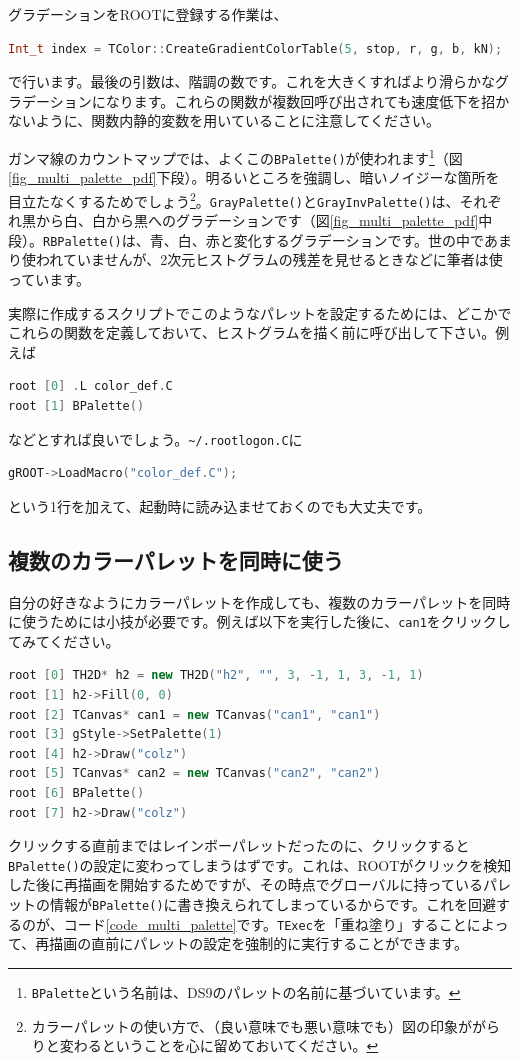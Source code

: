 グラデーションをROOTに登録する作業は、
\begin{lstlisting}[language=c++]
  Int_t index = TColor::CreateGradientColorTable(5, stop, r, g, b, kN);
\end{lstlisting}
で行います。最後の引数は、階調の数です。これを大きくすればより滑らかなグラデーションになります。これらの関数が複数回呼び出されても速度低下を招かないように、関数内静的変数を用いていることに注意してください。

ガンマ線のカウントマップでは、よくこの\texttt{BPalette()}が使われます\footnote{\texttt{BPalette}という名前は、DS9のパレットの名前に基づいています。}（図\ref{fig_multi_palette_pdf}下段）。明るいところを強調し、暗いノイジーな箇所を目立たなくするためでしょう\footnote{カラーパレットの使い方で、（良い意味でも悪い意味でも）図の印象ががらりと変わるということを心に留めておいてください。}。\texttt{GrayPalette()}と\texttt{GrayInvPalette()}は、それぞれ黒から白、白から黒へのグラデーションです（図\ref{fig_multi_palette_pdf}中段）。\texttt{RBPalette()}は、青、白、赤と変化するグラデーションです。世の中であまり使われていませんが、2次元ヒストグラムの残差を見せるときなどに筆者は使っています。

実際に作成するスクリプトでこのようなパレットを設定するためには、どこかでこれらの関数を定義しておいて、ヒストグラムを描く前に呼び出して下さい。例えば
\begin{lstlisting}[language=C++]
root [0] .L color_def.C
root [1] BPalette()
\end{lstlisting}
などとすれば良いでしょう。\texttt{\~{}/.rootlogon.C}に
\begin{lstlisting}[language=C++]
gROOT->LoadMacro("color_def.C");
\end{lstlisting}
という1行を加えて、起動時に読み込ませておくのでも大丈夫です。

\subsection{複数のカラーパレットを同時に使う}

自分の好きなようにカラーパレットを作成しても、複数のカラーパレットを同時に使うためには小技が必要です。例えば以下を実行した後に、\texttt{can1}をクリックしてみてください。
\begin{lstlisting}[language=C++]
root [0] TH2D* h2 = new TH2D("h2", "", 3, -1, 1, 3, -1, 1)
root [1] h2->Fill(0, 0)
root [2] TCanvas* can1 = new TCanvas("can1", "can1")
root [3] gStyle->SetPalette(1)
root [4] h2->Draw("colz")
root [5] TCanvas* can2 = new TCanvas("can2", "can2")
root [6] BPalette()
root [7] h2->Draw("colz")
\end{lstlisting}
クリックする直前まではレインボーパレットだったのに、クリックすると\texttt{BPalette()}の設定に変わってしまうはずです。これは、ROOTがクリックを検知した後に再描画を開始するためですが、その時点でグローバルに持っているパレットの情報が\texttt{BPalette()}に書き換えられてしまっているからです。これを回避するのが、コード\ref{code_multi_palette}です。\texttt{TExec}を「重ね塗り」することによって、再描画の直前にパレットの設定を強制的に実行することができます。

